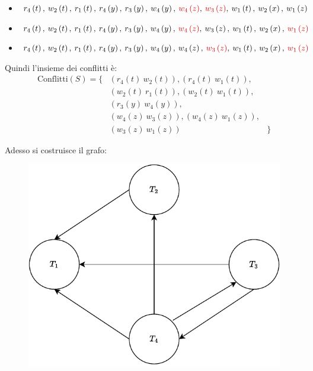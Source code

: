 \documentclass[a4paper]{article}
\begin{document}
\begin{itemize}
		\item $r_{4}\left(t\right), \: w_{2}\left(t\right), \: r_{1}\left(t\right), \: r_{4}\left(y\right), \: r_{3}\left(y\right), \: w_{4}\left(y\right), \: \textcolor{Red3}{w_{4}\left(z\right)}, \: \textcolor{Red3}{w_{3}\left(z\right)}, \: w_{1}\left(t\right), \: w_{2}\left(x\right), \: w_{1}\left(z\right)$
		
		\item $r_{4}\left(t\right), \: w_{2}\left(t\right), \: r_{1}\left(t\right), \: r_{4}\left(y\right), \: r_{3}\left(y\right), \: w_{4}\left(y\right), \: \textcolor{Red3}{w_{4}\left(z\right)}, \: w_{3}\left(z\right), \: w_{1}\left(t\right), \: w_{2}\left(x\right), \: \textcolor{Red3}{w_{1}\left(z\right)}$
		
		\item $r_{4}\left(t\right), \: w_{2}\left(t\right), \: r_{1}\left(t\right), \: r_{4}\left(y\right), \: r_{3}\left(y\right), \: w_{4}\left(y\right), \: w_{4}\left(z\right), \: \textcolor{Red3}{w_{3}\left(z\right)}, \: w_{1}\left(t\right), \: w_{2}\left(x\right), \: \textcolor{Red3}{w_{1}\left(z\right)}$
	\end{itemize}
	Quindi l'insieme dei conflitti è:
	\begin{equation*}
		\begin{array}{lll}
			\text{Conflitti}\left(S\right) = \{ & \left(r_{4}\left(t\right) \: w_{2}\left(t\right)\right), \left(r_{4}\left(t\right) \: w_{1}\left(t\right)\right), & \\
												& \left(w_{2}\left(t\right) \: r_{1}\left(t\right)\right), \left(w_{2}\left(t\right) \: w_{1}\left(t\right)\right), & \\
												& \left(r_{3}\left(y\right) \: w_{4}\left(y\right)\right),  														& \\
												& \left(w_{4}\left(z\right) \: w_{3}\left(z\right)\right), \left(w_{4}\left(z\right) \: w_{1}\left(z\right)\right), & \\
												& \left(w_{3}\left(z\right) \: w_{1}\left(z\right)\right) &	\}
		\end{array}
	\end{equation*}\newpage

	\noindent
	Adesso si costruisce il grafo:
	\begin{figure}[!htp]
		\centering
		\includegraphics[width=.7\textwidth]{img/CSR-4.pdf}
	\end{figure}
\end{document}
